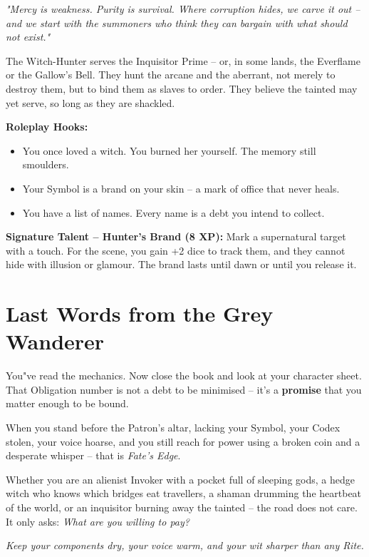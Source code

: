 \documentclass[10pt,a5paper]{book}
\begin{document}
\textit{"Mercy is weakness. Purity is survival. Where corruption hides, we carve it out -- and we start with the summoners who think they can bargain with what should not exist."}

The Witch-Hunter serves the Inquisitor Prime -- or, in some lands, the Everflame or the Gallow's Bell. They hunt the arcane and the aberrant, not merely to destroy them, but to bind them as slaves to order. They believe the tainted may yet serve, so long as they are shackled.

\textbf{Roleplay Hooks:}
\begin{itemize}
    \item You once loved a witch. You burned her yourself. The memory still smoulders.
    \item Your Symbol is a brand on your skin -- a mark of office that never heals.
    \item You have a list of names. Every name is a debt you intend to collect.
\end{itemize}

\textbf{Signature Talent -- Hunter's Brand (8 XP):} Mark a supernatural target with a touch. For the scene, you gain +2 dice to track them, and they cannot hide with illusion or glamour. The brand lasts until dawn or until you release it.

\clearpage

\chapter{Last Words from the Grey Wanderer}

You"ve read the mechanics. Now close the book and look at your character sheet. That Obligation number is not a debt to be minimised -- it's a \textbf{promise} that you matter enough to be bound.

When you stand before the Patron's altar, lacking your Symbol, your Codex stolen, your voice hoarse, and you still reach for power using a broken coin and a desperate whisper -- that is \textit{Fate's Edge}.

Whether you are an alienist Invoker with a pocket full of sleeping gods, a hedge witch who knows which bridges eat travellers, a shaman drumming the heartbeat of the world, or an inquisitor burning away the tainted -- the road does not care. It only asks: \textit{What are you willing to pay?}

\vspace{1cm}
\noindent \textit{Keep your components dry, your voice warm, and your wit sharper than any Rite.}
\end{document}
